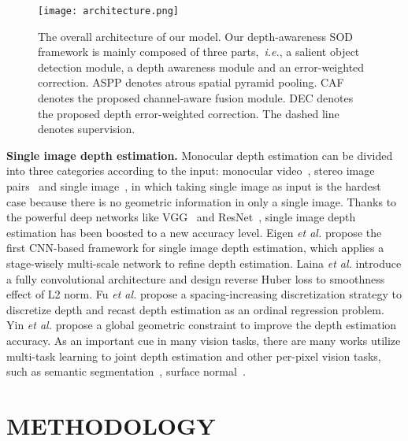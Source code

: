 \documentclass[sigconf]{acmart}
\def\ie{{\em i.e.}}
\def\etal{{\em et al.}}
\begin{document}
\begin{figure*}
	\begin{center}
\texttt{[image: architecture.png]}
		\caption{The overall architecture of our model. Our  depth-awareness SOD framework is mainly composed of three parts,~\ie, a salient object detection module, a depth awareness module and an error-weighted correction. ASPP denotes atrous spatial pyramid pooling. CAF denotes the proposed channel-aware fusion module. DEC denotes the proposed depth error-weighted correction. The dashed line denotes supervision. 
		}\label{fig:architecture}
	\end{center}
	
\end{figure*}

\textbf{Single image depth estimation.}
Monocular depth estimation can be divided into three categories according to the input: monocular video~\cite{wang2018learning,wang2019recurrent}, stereo image pairs~\cite{garg2016unsupervised,tosi2019learning} and single image~\cite{eigen2014depth,eigen2015predicting,laina2016deeper,fu2018deep,yin2019enforcing}, in which taking single image as input is the hardest case because there is no geometric information in only a single image. Thanks to the powerful deep networks like VGG~\cite{simonyan2014very} and ResNet~\cite{he2016deep}, single image depth estimation has been boosted to a new accuracy level. 
Eigen \etal \cite{eigen2014depth,eigen2015predicting} propose the first CNN-based framework for single image depth estimation, which applies a stage-wisely multi-scale network to refine depth estimation. Laina \etal{} \cite{laina2016deeper} introduce a fully convolutional architecture and design reverse Huber loss to smoothness effect of L2 norm. Fu \etal{} \cite{fu2018deep}  propose a spacing-increasing discretization strategy to discretize depth and recast depth estimation as an ordinal regression problem. Yin \etal \cite{yin2019enforcing} propose a global geometric constraint to improve the depth estimation accuracy.
As an important cue in many vision tasks, there are many works utilize multi-task learning to joint depth estimation and other per-pixel vision tasks, such as semantic segmentation~\cite{mousavian2016joint}, surface normal~\cite{yin2019enforcing}.







\section{METHODOLOGY}
\end{document}
